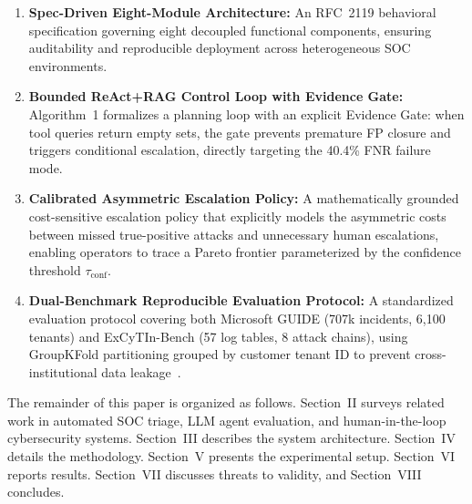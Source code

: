 \begin{enumerate}
  \item \textbf{Spec-Driven Eight-Module Architecture:} An RFC~2119 behavioral specification
  governing eight decoupled functional components, ensuring auditability and reproducible
  deployment across heterogeneous SOC environments.

  \item \textbf{Bounded ReAct+RAG Control Loop with Evidence Gate:} Algorithm~1
  formalizes a planning loop with an explicit Evidence Gate: when tool queries return
  empty sets, the gate prevents premature FP closure and triggers conditional escalation,
  directly targeting the 40.4\% FNR failure mode.

  \item \textbf{Calibrated Asymmetric Escalation Policy:} A mathematically grounded
  cost-sensitive escalation policy that explicitly models the asymmetric costs between
  missed true-positive attacks and unnecessary human escalations, enabling operators to
  trace a Pareto frontier parameterized by the confidence threshold $\tau_{\text{conf}}$.

  \item \textbf{Dual-Benchmark Reproducible Evaluation Protocol:} A standardized evaluation
  protocol covering both Microsoft GUIDE (707k incidents, 6,100 tenants) and ExCyTIn-Bench
  (57 log tables, 8 attack chains), using GroupKFold partitioning grouped by customer tenant
  ID to prevent cross-institutional data leakage~\cite{arp2022dos}.
\end{enumerate}

The remainder of this paper is organized as follows. Section~II surveys related work in
automated SOC triage, LLM agent evaluation, and human-in-the-loop cybersecurity systems.
Section~III describes the system architecture. Section~IV details the methodology.
Section~V presents the experimental setup. Section~VI reports results. Section~VII
discusses threats to validity, and Section~VIII concludes.
